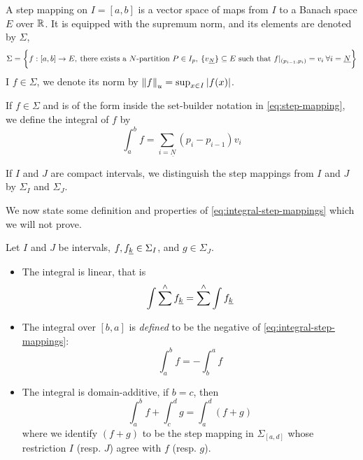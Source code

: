 \documentclass[../main-v2-manifolds.tex]{subfiles}
\begin{document}
\begin{definition}\label{def:step-mapping}
A step mapping on $I = [a,b]$ is a vector space of maps from $I$ to a Banach space $E$ over $\mathbb{R}$. It is equipped with the supremum norm, and its elements are denoted by $\Sigma$,
\begin{equation}\label{eq:step-mapping}
    \Sigma = \bigset{f: [a,b]\to E,\: \text{there exists a $N$-partition }P\in I_p,\:\{\UL{v}[N]\}\subseteq E\text{ such that } f\vert_{(p_{i-1}, p_i)} = v_i\: \forall i = \underline{N}}
\end{equation}
I $f\in \Sigma$, we denote its norm by $\norm{f}_u = \sup_{x\in I}\vert {f(x)} \vert$.
\end{definition}
%
\begin{definition}\label{def:integral-step-mappings}
    If $f\in \Sigma$ and is of the form inside the set-builder notation in \cref{eq:step-mapping}, we define the integral of $f$ by
    \begin{equation}\label{eq:integral-step-mappings}
        \int_a^b f = \sum_{i=\underline{N}}(p_i - p_{i-1})v_i
    \end{equation}
\end{definition}
%
\begin{remark}
If $I$ and $J$ are compact intervals, we distinguish the step mappings from $I$ and $J$ by $\Sigma_I$ and $\Sigma_J$.    
\end{remark}
%
We now state some definition and properties of \cref{eq:integral-step-mappings} which we will not prove. 
\begin{wts}\label{prop:properties-integral-step-mappings}
    Let $I$ and $J$ be intervals, $f,\UL{f}[k]\in \Sigma_I$, and $g\in \Sigma_J$. 
    \begin{itemize}
        \item The integral is linear, that is
        \begin{equation}\label{eq:integral-step-mappings-linear}
            \int \sum^\wedge \UL{f}[k] = \sum^\wedge \int \UL{f}[k]
        \end{equation}
        \item The integral over $[b,a]$ is \emph{defined} to be the negative of \cref{eq:integral-step-mappings}:
        \begin{equation}\label{eq:integral-step-mappings-negative}
            \int_a^b f = - \int_b^a f
        \end{equation}
        \item The integral is domain-additive, if $b=c$, then 
        \begin{equation}\label{eq:integral-step-mappings-domain-additive}
            \int_a^b f + \int_c^d g = \int_a^d (f+g)
        \end{equation}
        where we identify $(f+g)$ to be the step mapping in $\Sigma_{[a,d]}$ whose restriction $I$ (resp. $J$) agree with $f$ (resp. $g$).
    \end{itemize}
\end{wts}
\end{document}
